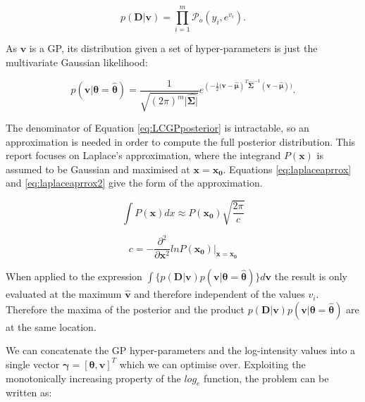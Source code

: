 \documentclass[a4paper,11pt]{report}
\begin{document}
\begin{equation} \label{eq:LGCPlikelihood}
p(\mathbf{D|v}) = \prod_{i=1}^{m} \mathcal{P}_o (y_i, e^{v_i}).
\end{equation}

As \(\mathbf{v}\) is a GP, its distribution given a set of hyper-parameters is just the multivariate Gaussian likelihood:

\begin{equation}
p(\mathbf{v}|\boldsymbol{\theta}=\hat{\boldsymbol{\theta}}) = \frac{1}{\sqrt{(2\pi)^{m} |\hat{\boldsymbol{\Sigma|}}}} e^{(- \frac{1}{2} \mathbf{(v}-\hat{\boldsymbol{\mu}})^{T}\hat{\boldsymbol{\Sigma}}^{-1}(\mathbf{v}-\hat{\boldsymbol{\mu}}))}.
\end{equation}


The denominator of Equation \ref{eq:LCGPposterior} is intractable, so an approximation is needed in order to compute the full posterior distribution. This report focuses on Laplace's approximation, where the integrand \(P(\mathbf{x})\) is assumed to be Gaussian and maximised at \(\mathbf{x=x_0}\). Equations \ref{eq:laplaceaprrox} and \ref{eq:laplaceaprrox2} give the form of the approximation\cite{Mackay}. 

\singlespacing

\begin{equation} \label{eq:laplaceaprrox}
\int{P(\mathbf{x}) dx} \approx P(\mathbf{x_0}) \sqrt{\frac{2\pi}{c}}
\end{equation} 

\begin{equation} \label{eq:laplaceaprrox2}
c = - \frac{\partial^2}{\partial \mathbf{x}^2} ln P(\mathbf{x_0}) |_{\mathbf{x}=\mathbf{x_0}}
\end{equation}

\doublespacing 

When applied to the expression \(\int{\{p(\mathbf{D|v}) p(\mathbf{v}|\boldsymbol{\theta}=\hat{\boldsymbol{\theta}})\} d\mathbf{v}} \) the result is only evaluated at the maximum \(\hat{\mathbf{v}}\) and therefore independent of the values \(v_i\). Therefore the maxima of the posterior and the product \(p(\mathbf{D|v}) p(\mathbf{v}|\boldsymbol{\theta}=\hat{\boldsymbol{\theta}})\) are at the same location.

We can concatenate the GP hyper-parameters and the log-intensity values into a single vector \( \boldsymbol{\gamma} = [\boldsymbol{\theta}, \mathbf{v}]^{T}\) which we can optimise over. Exploiting the monotonically increasing property of the \(log_e\) function, the problem can be written as:
\end{document}
